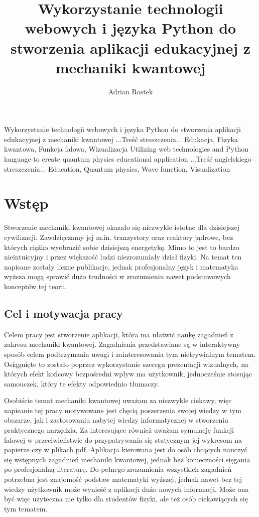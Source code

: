 \documentclass{SGGW-thesis}
\title{Wykorzystanie technologii webowych i języka Python do stworzenia aplikacji edukacyjnej z mechaniki kwantowej}
\author{Adrian Rostek}
\begin{document}
\maketitle
\statementpage
\abstractpage
{Wykorzystanie technologii webowych i języka Python do stworzenia aplikacji edukacyjnej z mechaniki kwantowej}
{...Treść streszczenia...}
{Edukacja, Fizyka kwantowa, Funkcja falowa, Wizualizacja}
{Utilizing web technologies and Python language to create quantum physics educational application}
{...Treść angielskiego streszczenia...}
{Education, Quantum physics, Wave function, Visualization}


{
  \doublespacing
  \tableofcontents
}

\startchapterfromoddpage %

\chapter{Wstęp}
Stworzenie mechaniki kwantowej okazało się niezwykle istotne dla dzisiejszej cywilizacji. Zawdzięczamy jej m.in. tranzystory oraz reaktory jądrowe, bez których ciężko wyobrazić sobie dzisiejszą energetykę\cite{ene jadrowa}. Mimo to jest to bardzo nieintuicyjny i przez większość ludzi niezrozumiały dział fizyki\cite{kwantowa trudna}. Na temat ten napisane zostały liczne publikacje\cite{kwant publikacje}, jednak profesjonalny język i matematyka wyższa mogą sprawić dużo trudności w zrozumieniu nawet podstawowych konceptów tej teorii.

	\section{Cel i motywacja pracy}
	Celem pracy jest stworzenie aplikacji, która ma ułatwić naukę zagadnień z zakresu mechaniki kwantowej. Zagadnienia przedstawiane są w interaktywny sposób celem podtrzymania uwagi i zainteresowania tym nietrywialnym tematem. Osiągnięte to zostało poprzez wykorzystanie szeregu prezentacji wizualnych, na których efekt końcowy bezpośredni wpływ ma użytkownik, jednocześnie stosując samouczek, który te efekty odpowiednio tłumaczy.
	
	Osobiście temat mechaniki kwantowej uważam za niezwykle ciekawy, więc napisanie tej pracy motywowane jest chęcią poszerzenia swojej wiedzy w tym obszarze, jak i zastosowaniu nabytej wiedzy informatycznej w stworzeniu praktycznego narzędzia. Za interesujące również uważam symulację funkcji falowej w przeciwieństwie do przypatrywania się statycznym jej wykresom na papierze czy w plikach pdf. Aplikacja kierowana jest do osób chcących nauczyć się wstępnych zagadnień mechaniki kwantowej, jednak bez konieczności sięgania po profesjonalną literaturę. Do pełnego zrozumienia wszystkich zagadnień potrzebna jest znajomość podstaw matematyki wyższej, jednak nawet bez tej wiedzy użytkownik może wynieść z aplikacji dużo nowych informacji. Może ona być więc użyteczna nie tylko dla studentów fizyki, ale też osób ciekawiących się tym tematem.
\end{document}
